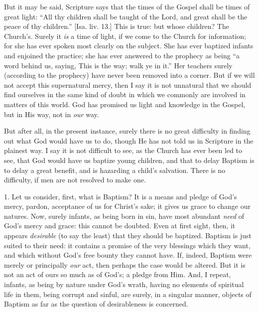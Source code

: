 But it may be said, Scripture says that the times of
the Gospel shall be times of great light: ``All thy
children shall be taught of the Lord, and great shall be
the peace of thy children.'' [Isa. liv. 13.] This is
true: but whose children? The Church's. Surely it \emph{is}
a time of light, if we come to the Church for
information; for she has ever spoken most clearly on the
subject. She has ever baptized infants and enjoined the
practice; she has ever answered to the prophecy as being
``a word behind us, saying, This is the way; walk ye
in it.'' Her teachers surely (according to the
prophecy) have never been removed into a corner. But if
we will not accept this supernatural mercy, then I say it
is not unnatural that we should find ourselves in the
same kind of doubt in which we commonly are involved in
matters of this world. God has promised us light and
knowledge in the Gospel, but in His way, not in \emph{our}
way.

But after all, in the present instance, surely there
is no great difficulty in finding out what God would have us to do, though He has not told us in Scripture in the
plainest way. I say it is not difficult to see, as the
Church has ever been led to see, that God would have us
baptize young children, and that to delay Baptism is to
delay a great benefit, and is hazarding a child's
salvation. There is no difficulty, if men are not
resolved to make one.

1. Let us consider, first, what is Baptism? It is a
means and pledge of God's mercy, pardon, acceptance of us
for Christ's sake; it gives us grace to change our
natures. Now, surely infants, as being born in sin, have
most abundant \emph{need} of God's mercy and grace:
this cannot be doubted. Even at first sight, then, it
appears \emph{desirable} (to say the least) that they
should be baptized. Baptism is just suited to their need:
it contains a promise of the very blessings which they
want, and which without God's free bounty they cannot
have. If, indeed, Baptism were merely or principally \emph{our}
act, then perhaps the case would be altered. But it is
not an act of ours so much as of God's; a pledge from
Him. And, I repeat, infants, as being by nature under
God's wrath, having no elements of spiritual life in
them, being corrupt and sinful, are surely, in a singular
manner, objects of Baptism as far as the question of
desirableness is concerned.

